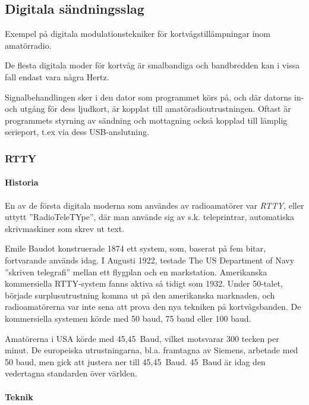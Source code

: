 \subsection{Digitala sändningsslag}

Exempel på digitala modulationstekniker för kortvågstillämpningar inom
amatörradio.

De flesta digitala moder för kortvåg är smalbandiga och bandbredden kan i vissa
fall endast vara några Hertz. 

Signalbehandlingen sker i den dator som programmet körs på, och där datorns
in- och utgång för dess ljudkort, är kopplat till amatöradioutrustningen.
Oftast är programmets styrning av sändning och  mottagning också kopplad till
lämplig serieport, t.ex via dess USB-anslutning.

\subsubsection{RTTY}

\paragraph{Historia}

En av de första digitala moderna som användes av radioamatörer var \emph{RTTY},
eller uttytt ''RadioTeleTYpe'', där man använde sig av s.k. teleprintrar,
automatiska skrivmaskiner som skrev ut text.

Emile Baudot konstruerade 1874 ett system, som, baserat på fem bitar,
fortvarande används idag.
I Augusti 1922, testade The US Department of Navy ''skriven telegrafi'' mellan
ett flygplan och en markstation.
Amerikanska kommersiella RTTY-system fanns aktiva så tidigt som 1932.
Under 50-talet, började surplusutrustning komma ut på den amerikanska
marknaden, och radioamatörerna var inte sena att prova den nya tekniken på
kortvågsbanden.
De kommersiella systemen körde med 50 baud, 75 baud eller 100 baud.

Amatörerna i USA körde med 45,45~Baud, vilket motsvarar 300 tecken per minut.
De europeiska utrustningarna, bl.a. framtagna av Siemens, arbetade med 50 baud,
men gick att justera ner till 45,45~Baud.
45~Baud är idag den vedertagna standarden över världen.

\paragraph{Teknik}

